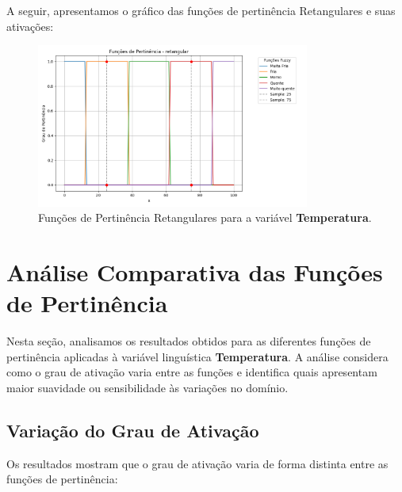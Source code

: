 \documentclass[a4paper,12pt]{article}
\begin{document}
A seguir, apresentamos o gráfico das funções de pertinência Retangulares e suas ativações:

\begin{figure}[H]
    \centering
    \includegraphics[width=0.8\textwidth]{img/funções_de_pertinência_retangular_fuzzificado.png}
    \caption{Funções de Pertinência Retangulares para a variável \textbf{Temperatura}.}
\end{figure}
\section{Análise Comparativa das Funções de Pertinência}

Nesta seção, analisamos os resultados obtidos para as diferentes funções de pertinência aplicadas à variável linguística \textbf{Temperatura}. A análise considera como o grau de ativação varia entre as funções e identifica quais apresentam maior suavidade ou sensibilidade às variações no domínio.

\subsection{Variação do Grau de Ativação}

Os resultados mostram que o grau de ativação varia de forma distinta entre as funções de pertinência:
\end{document}
